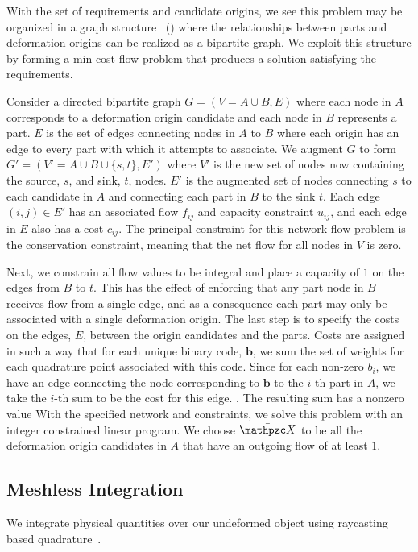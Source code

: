 With the set of requirements and candidate origins, we see this problem may be organized in a graph structure ~() where the relationships between parts and deformation origins can be realized as a bipartite graph. We exploit this structure by forming a min-cost-flow problem that produces a solution satisfying the requirements.

Consider a directed bipartite graph $G=(V = A \cup B,E)$ where each node in $A$ corresponds to a deformation origin candidate and each node in $B$ represents a part. $E$ is the set of edges connecting nodes in $A$ to $B$ where each origin has an edge to every part with which it attempts to associate. We augment $G$ to form $G'=(V' = A \cup B \cup \{s,t\}, E')$ where $V'$  is the new set of nodes now containing the source, $s$, and sink, $t$, nodes. $E'$ is the augmented set of nodes connecting $s$ to each candidate in $A$ and connecting each part in $B$ to the sink $t$. Each edge $(i,j) \in E'$ has an associated flow $f_{ij}$ and capacity constraint $u_{ij}$, and each edge in $E$ also has a cost $c_{ij}$. The principal constraint for this network flow problem is the conservation constraint, meaning that the net flow for all nodes in $V$ is zero.

Next, we constrain all flow values to be integral and place a capacity of $1$ on the edges from $B$ to $t$. This has the effect of enforcing that any part node in $B$ receives flow from a single edge, and as a consequence each part may only be associated with a single deformation origin. The last step is to specify the costs on the edges, $E$, between the origin candidates and the parts. Costs are assigned in such a way that for each unique binary code, $\mathbf{b}$, we sum the set of weights for each quadrature point associated with this code. Since for each non-zero $b_i$, we have an edge connecting the node corresponding to $\mathbf{b}$ to the $i$-th part in $A$, we take the $i$-th sum to be the cost for this edge. . The resulting sum has a nonzero value With the specified network and constraints, we solve this problem with an integer constrained linear program. We choose $\XBs$ to be all the deformation origin candidates in $A$ that have an outgoing flow of at least $1$.


\subsection{Meshless Integration}

We integrate physical quantities over our undeformed object using raycasting based quadrature~\cite{KHOSRAVIFARD201030}.

